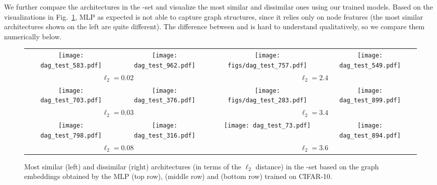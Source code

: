 We further compare the architectures in the \iid-\iidtest set and visualize the most similar and dissimilar ones using our trained models. Based on the visualizations in Fig.~\ref{fig:compare}, MLP as expected is not able to capture graph structures, since it relies only on node features (the most similar architectures shown on the left are quite different). The difference between \ghnbase and \ghnours is hard to understand qualitatively, so we compare them numerically below.


\begin{figure}[htpb]
	\centering
	\scriptsize
	\vspace{0pt}
	\setlength{\tabcolsep}{1pt}
	\begin{tabular}{cc|cc}
		{\texttt{[image: dag\_test\_583.pdf]}} & {\texttt{[image: dag\_test\_962.pdf]}} & 
		{\texttt{[image: figs/dag\_test\_757.pdf]}} & {\texttt{[image: dag\_test\_549.pdf]}} \\
		\multicolumn{2}{c}{$\ell_2=0.02$} & \multicolumn{2}{c}{$\ell_2=2.4$} \Bstrut \\
		
		{\texttt{[image: dag\_test\_703.pdf]}} & {\texttt{[image: dag\_test\_376.pdf]}} & 
		{\texttt{[image: figs/dag\_test\_283.pdf]}} & {\texttt{[image: dag\_test\_899.pdf]}} \\
		\multicolumn{2}{c}{$\ell_2=0.03$} & \multicolumn{2}{c}{$\ell_2=3.4$} \Bstrut \\
		
		{\texttt{[image: dag\_test\_798.pdf]}} & {\texttt{[image: dag\_test\_316.pdf]}} & 
		{\texttt{[image: dag\_test\_73.pdf]}} & {\texttt{[image: dag\_test\_894.pdf]}} \\
		\multicolumn{2}{c}{$\ell_2=0.08$} & \multicolumn{2}{c}{$\ell_2=3.6$}
	\end{tabular}
	\caption{Most similar (left) and dissimilar (right) architectures (in terms of the $\ell_2$ distance) in the \iid-\iidtest set based on the graph embeddings obtained by the MLP (top row), \ghnbase (middle row) and \ghnours (bottom row) trained on CIFAR-10.}
	\label{fig:compare}
	\vspace{0pt}
\end{figure}



